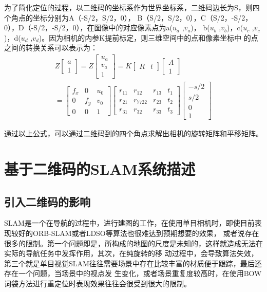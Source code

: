 为了简化定位的过程，以二维码的坐标系作为世界坐标系，二维码边长为S，则四个角点的坐标分别为A（-S/2，S/2，0），
B（S/2，S/2，0），C（S/2，-S/2，0），D（-S/2，-S/2，0），在图像中的对应像素点为a($u_a$ ,$v_a$)，
b($u_b$ ,$v_b$)，c($u_c$ ,$v_c$)，d($u_d$ ,$v_d$)。因为相机的内参K提前标定，则三维空间中的点和像素坐标中
的点之间的转换关系可以表示为：
\begin{equation}
\begin{split}
  Z{
  \left[ \begin{array}{ccc}
  a\\1
  \end{array} 
  \right ]}=Z{
  \left[ \begin{array}{ccc}
  u_a\\v_a\\1
  \end{array} \right ]}=K{
  \left[ \begin{array}{ccc}
  R&t
  \end{array} \right ]}{
  \left[ \begin{array}{ccc}
  A\\1
  \end{array} \right ]} \\
  ={
  \left[ \begin{array}{ccc}
  f_x & 0 & u_0\\0 & f_y &v_0 \\0 & 0 & 1
  \end{array} \right ]}{
  \left[ \begin{array}{cccc}
  r_{11}&r_{12}&r_{13}&t_1\\r_{21}&r_{7722}&r_{23}&t_2\\r_{31}&r_{32}&r_{33}&t_3
  \end{array} \right ]}{
  \left[ \begin{array}{ccc}
  -s/2\\s/2\\0\\1
  \end{array} \right ]}
\end{split}
\end{equation}

通过以上公式，可以通过二维码到的四个角点求解出相机的旋转矩阵和平移矩阵。
\section{基于二维码的SLAM系统描述}
\label{sec:2.3}
\subsection{引入二维码的影响}
\label{sec:2.3.1}
SLAM是一个在导航的过程中，进行建图的工作，在使用单目相机时，即使目前表现较好的ORB-SLAM或者LDSO等算法也很难达到预期想要的效果，
或者说存在很多的限制。第一个问题即是，所构成的地图的尺度是未知的，这样就造成无法在实际的导航任务中发挥作用，其次，在纯旋转的移
动过程中，会导致算法失效，第三个就是单目视觉SLAM往往需要场景中存在比较丰富的材质便于跟踪，最后还存在一个问题，当场景中的视点发
生变化，或者场景重复度较高时，在使用BOW词袋方法进行重定位时表现效果往往会很受到很大的限制。

